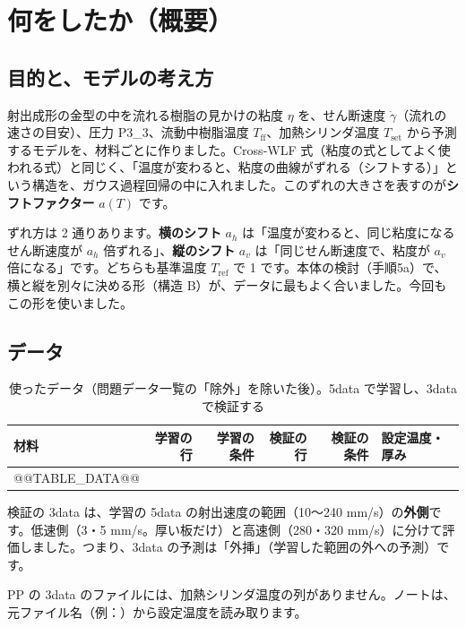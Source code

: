 \documentclass[paper=a4paper,fontsize=10.5pt,line_length=44zw,number_of_lines=38]{jlreq}
\newcommand{\file}[1]{\texttt{\detokenize{#1}}}
\newcommand{\gd}{\dot{\gamma}}
\newcommand{\Tff}{T_{\mathrm{ff}}}
\newcommand{\Tset}{T_{\mathrm{set}}}
\newcommand{\PIII}{P3\_3}
\begin{document}
\section{何をしたか（概要）}

\subsection{目的と、モデルの考え方}
射出成形の金型の中を流れる樹脂の見かけの粘度 $\eta$ を、せん断速度 $\gd$（流れの速さの目安）、圧力 \PIII、流動中樹脂温度 $\Tff$、加熱シリンダ温度 $\Tset$ から予測するモデルを、材料ごとに作りました。Cross-WLF 式（粘度の式としてよく使われる式）と同じく、「温度が変わると、粘度の曲線がずれる（シフトする）」という構造を、ガウス過程回帰の中に入れました。このずれの大きさを表すのが\textbf{シフトファクター} $a(T)$ です。

ずれ方は 2 通りあります。\textbf{横のシフト} $a_h$ は「温度が変わると、同じ粘度になるせん断速度が $a_h$ 倍ずれる」、\textbf{縦のシフト} $a_v$ は「同じせん断速度で、粘度が $a_v$ 倍になる」です。どちらも基準温度 $T_{\mathrm{ref}}$ で 1 です。本体の検討（手順5a）で、横と縦を別々に決める形（構造 B）が、データに最もよく合いました。今回もこの形を使いました。

\subsection{データ}
\begin{table}[H]
\caption{使ったデータ（問題データ一覧の「除外」を除いた後）。5data で学習し、3data で検証する}\label{tab:data}
\small
\begin{tabularx}{\linewidth}{@{}lrrrrX@{}}
\toprule
材料 & 学習の行 & 学習の条件 & 検証の行 & 検証の条件 & 設定温度・厚み \\
\midrule
@@TABLE_DATA@@
\bottomrule
\end{tabularx}
\end{table}
検証の 3data は、学習の 5data の射出速度の範囲（10〜240 mm/s）の\textbf{外側}です。低速側（3・5 mm/s。厚い板だけ）と高速側（280・320 mm/s）に分けて評価しました。つまり、3data の予測は「外挿」（学習した範囲の外への予測）です。

PP の 3data のファイルには、加熱シリンダ温度の列がありません。ノートは、元ファイル名（例：\file{071_190℃_280_0.5mm.csv}）から設定温度を読み取ります。
\end{document}
